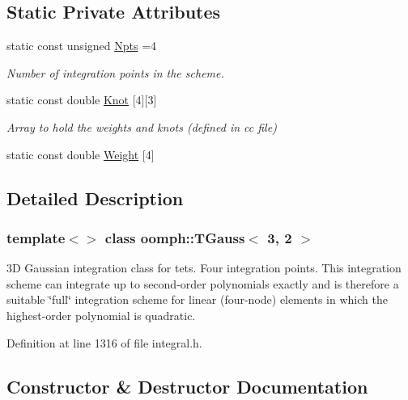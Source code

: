 \subsection*{Static Private Attributes}
\begin{DoxyCompactItemize}
\item 
static const unsigned \hyperlink{classoomph_1_1TGauss_3_013_00_012_01_4_a70f1dcbd8c967a9e035f50899e6780be}{Npts} =4
\begin{DoxyCompactList}\small\item\em Number of integration points in the scheme. \end{DoxyCompactList}\item 
static const double \hyperlink{classoomph_1_1TGauss_3_013_00_012_01_4_a692944c162c388b34db5750db08a092e}{Knot} \mbox{[}4\mbox{]}\mbox{[}3\mbox{]}
\begin{DoxyCompactList}\small\item\em Array to hold the weights and knots (defined in cc file) \end{DoxyCompactList}\item 
static const double \hyperlink{classoomph_1_1TGauss_3_013_00_012_01_4_ada8fc48ffabeddd59812d0f7b98b818f}{Weight} \mbox{[}4\mbox{]}
\end{DoxyCompactItemize}


\subsection{Detailed Description}
\subsubsection*{template$<$$>$\newline
class oomph\+::\+T\+Gauss$<$ 3, 2 $>$}

3D Gaussian integration class for tets. Four integration points. This integration scheme can integrate up to second-\/order polynomials exactly and is therefore a suitable \char`\"{}full\char`\"{} integration scheme for linear (four-\/node) elements in which the highest-\/order polynomial is quadratic. 

Definition at line 1316 of file integral.\+h.



\subsection{Constructor \& Destructor Documentation}
\mbox{\label{classoomph_1_1TGauss_3_013_00_012_01_4_a0bec51c53d908468826c98663846a739}} 
